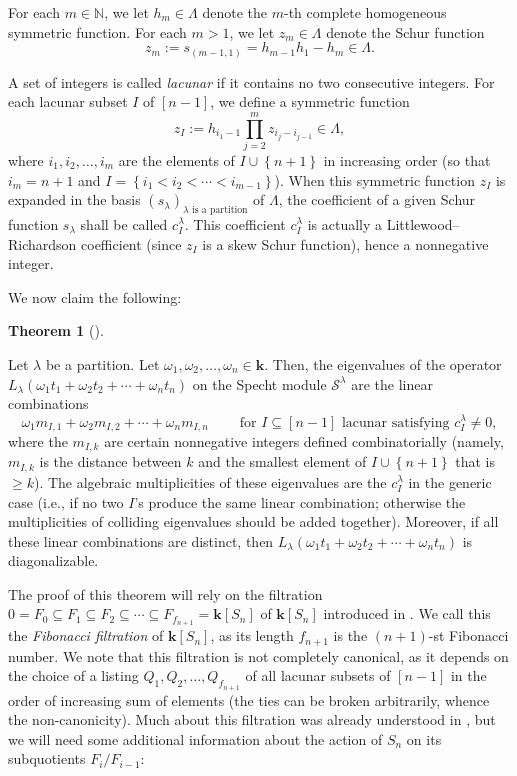 \documentclass[numbers=enddot,12pt,final,onecolumn,notitlepage]{scrartcl}%
\theoremstyle{definition}
\newtheorem{theo}{Theorem}[section]
\newenvironment{theorem}[1][]
{\begin{theo}[#1]\begin{leftbar}}
{\end{leftbar}\end{theo}}
\let\prodnonlimits\prod
\renewcommand{\prod}{\prodnonlimits\limits}
\begin{document}
For each $m\in\mathbb{N}$, we let $h_{m}\in\Lambda$ denote the $m$-th complete
homogeneous symmetric function. For each $m>1$, we let $z_{m}\in\Lambda$
denote the Schur function
\[
z_{m}:=s_{\left(  m-1,1\right)  }=h_{m-1}h_{1}-h_{m}\in\Lambda.
\]


A set of integers is called \emph{lacunar} if it contains no two consecutive
integers. For each lacunar subset $I$ of $\left[  n-1\right]  $, we define a
symmetric function%
\[
z_{I}:=h_{i_{1}-1}\prod_{j=2}^{m}z_{i_{j}-i_{j-1}}\in\Lambda,
\]
where $i_{1},i_{2},\ldots,i_{m}$ are the elements of $I\cup\left\{
n+1\right\}  $ in increasing order (so that $i_{m}=n+1$ and $I=\left\{
i_{1}<i_{2}<\cdots<i_{m-1}\right\}  $). When this symmetric function $z_{I}$
is expanded in the basis $\left(  s_{\lambda}\right)  _{\lambda\text{ is a
partition}}$ of $\Lambda$, the coefficient of a given Schur function
$s_{\lambda}$ shall be called $c_{I}^{\lambda}$. This coefficient
$c_{I}^{\lambda}$ is actually a Littlewood--Richardson coefficient (since
$z_{I}$ is a skew Schur function), hence a nonnegative integer.

We now claim the following:

\begin{theorem}
[part of Theorem \ref{thm.eigs}]\label{thm.intro.eigs}Let $\lambda$ be a
partition. Let $\omega_{1},\omega_{2},\ldots,\omega_{n}\in\mathbf{k}$. Then,
the eigenvalues of the operator $L_{\lambda}\left(  \omega_{1}t_{1}+\omega
_{2}t_{2}+\cdots+\omega_{n}t_{n}\right)  $ on the Specht module $\mathcal{S}%
^{\lambda}$ are the linear combinations%
\[
\omega_{1}m_{I,1}+\omega_{2}m_{I,2}+\cdots+\omega_{n}m_{I,n}%
\ \ \ \ \ \ \ \ \ \ \text{for }I\subseteq\left[  n-1\right]  \text{ lacunar
satisfying }c_{I}^{\lambda}\neq0,
\]
where the $m_{I,k}$ are certain nonnegative integers defined combinatorially
(namely, $m_{I,k}$ is the distance between $k$ and the smallest element of
$I\cup\left\{  n+1\right\}  $ that is $\geq k$). The algebraic multiplicities
of these eigenvalues are the $c_{I}^{\lambda}$ in the generic case (i.e., if
no two $I$'s produce the same linear combination; otherwise the multiplicities
of colliding eigenvalues should be added together). Moreover, if all these
linear combinations are distinct, then $L_{\lambda}\left(  \omega_{1}%
t_{1}+\omega_{2}t_{2}+\cdots+\omega_{n}t_{n}\right)  $ is diagonalizable.
\end{theorem}

The proof of this theorem will rely on the filtration $0=F_{0}\subseteq
F_{1}\subseteq F_{2}\subseteq\cdots\subseteq F_{f_{n+1}}=\mathbf{k}\left[
S_{n}\right]  $ of $\mathbf{k}\left[  S_{n}\right]  $ introduced in
\cite[\S 8.1]{s2b1}. We call this the \emph{Fibonacci filtration} of
$\mathbf{k}\left[  S_{n}\right]  $, as its length $f_{n+1}$ is the $\left(
n+1\right)  $-st Fibonacci number. We note that this filtration is not
completely canonical, as it depends on the choice of a listing $Q_{1}%
,Q_{2},\ldots,Q_{f_{n+1}}$ of all lacunar subsets of $\left[  n-1\right]  $ in
the order of increasing sum of elements (the ties can be broken arbitrarily,
whence the non-canonicity). Much about this filtration was already understood
in \cite{s2b1}, but we will need some additional information about the action
of $S_{n}$ on its subquotients $F_{i}/F_{i-1}$:
\end{document}
